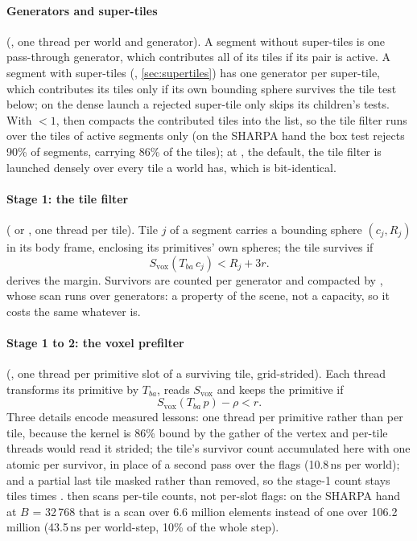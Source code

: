 \paragraph{Generators and super-tiles} (, one thread per world and generator). A segment without super-tiles is one pass-through generator, which contributes all of its tiles if its pair is active. A segment with super-tiles (, \cref{sec:supertiles}) has one generator per super-tile, which contributes its tiles only if its own bounding sphere survives the tile test below; on the dense launch a rejected super-tile only skips its children's tests. With  $< 1$,  then compacts the contributed tiles into the  list, so the tile filter runs over the tiles of active segments only (on the SHARPA hand the box test rejects 90\% of segments, carrying 86\% of the tiles); at , the default, the tile filter is launched densely over every tile a world has, which is bit-identical.

\paragraph{Stage 1: the tile filter} ( or , one thread per tile). Tile $j$ of a segment carries a bounding sphere $(c_j, R_j)$ in its body frame, enclosing its primitives' own spheres; the tile survives if
\begin{equation}\label{eq:tile}
S_{\mathrm{vox}}(T_{ba}\, c_j) < R_j + 3r .
\end{equation}
 derives the margin. Survivors are counted per generator and compacted by , whose scan runs over generators: a property of the scene, not a capacity, so it costs the same whatever  is.

\paragraph{Stage 1 to 2: the voxel prefilter} (, one thread per primitive slot of a surviving tile, grid-strided). Each thread transforms its primitive by $T_{ba}$, reads $S_{\mathrm{vox}}$ and keeps the primitive if
\begin{equation}\label{eq:prefilter}
S_{\mathrm{vox}}(T_{ba}\, p) - \rho < r .
\end{equation}
Three details encode measured lessons: one thread per primitive rather than per tile, because the kernel is 86\% bound by the gather of the vertex and per-tile threads would read it strided; the tile's survivor count accumulated here with one atomic per survivor, in place of a second pass over the flags (10.8\,ns per world); and a partial last tile masked rather than removed, so the stage-1 count stays tiles times .  then scans per-tile counts, not per-slot flags: on the SHARPA hand at $B$ = 32\,768 that is a scan over 6.6 million elements instead of one over 106.2 million (43.5\,ns per world-step, 10\% of the whole step).

